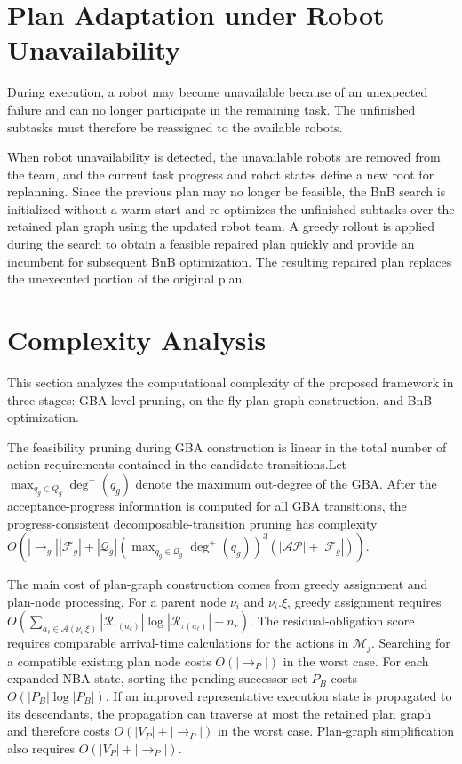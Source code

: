 \documentclass[lettersize,journal]{IEEEtran}
\theoremstyle{italiclemma}
\theoremstyle{italiclemma}
\theoremstyle{definition}
\begin{document}
\section{Plan Adaptation under Robot Unavailability}
\label{sec:plan_adaptation}
During execution, a robot may become unavailable because of an unexpected failure and can no longer participate in the remaining task. The unfinished subtasks must therefore be reassigned to the available robots.

When robot unavailability is detected, the unavailable robots are removed from the team, and the current task progress and robot states define a new root for replanning. Since the previous plan may no longer
be feasible, the BnB search is initialized without a warm start and re-optimizes the unfinished subtasks over the retained plan graph using the updated robot team. A greedy rollout is applied during the search to obtain a feasible repaired plan quickly and provide an incumbent for
subsequent BnB optimization. The resulting repaired plan replaces the unexecuted portion of the original plan.

\section{Complexity Analysis}
\label{sec:complexity}

This section analyzes the computational complexity of the proposed framework in three stages: GBA-level pruning, on-the-fly plan-graph construction, and BnB optimization.

The feasibility pruning during GBA construction is linear in the total number of action requirements contained in the candidate transitions.Let $\max_{q_g\in Q_g}\deg^+(q_g)$ denote the maximum out-degree of the GBA. After the acceptance-progress information is computed for all GBA transitions, the progress-consistent decomposable-transition pruning has complexity $O(|\rightarrow_g||\mathcal F_g|+|\mathcal Q_g|(\max_{q_g\in \mathcal  Q_g}\deg^+(q_g))^3(|\mathcal{AP}|+|\mathcal F_g|))$.

The main cost of plan-graph construction comes from greedy assignment and plan-node processing. For a parent node $\nu_i$ and $\nu_i.\xi$, greedy assignment requires
$O(\sum_{a_\ell\in\mathcal A(\nu_i.\xi)}
|\mathcal R_{\tau(a_\ell)}|\log|\mathcal R_{\tau(a_\ell)}|+n_r)$. The residual-obligation score requires
comparable arrival-time calculations for the actions in $\mathcal M_j$. Searching for a compatible existing plan node costs $O(|\rightarrow_P|)$ in the worst case. For each expanded NBA state, sorting the pending successor
set $P_B$ costs $O(|P_B|\log|P_B|)$. If an improved representative execution state is propagated to its descendants, the propagation can traverse at most the retained plan graph and therefore costs $O(|V_P|+|\rightarrow_P|)$ in the worst case. Plan-graph simplification also requires $O(|V_P|+|\rightarrow_P|)$.
\end{document}
